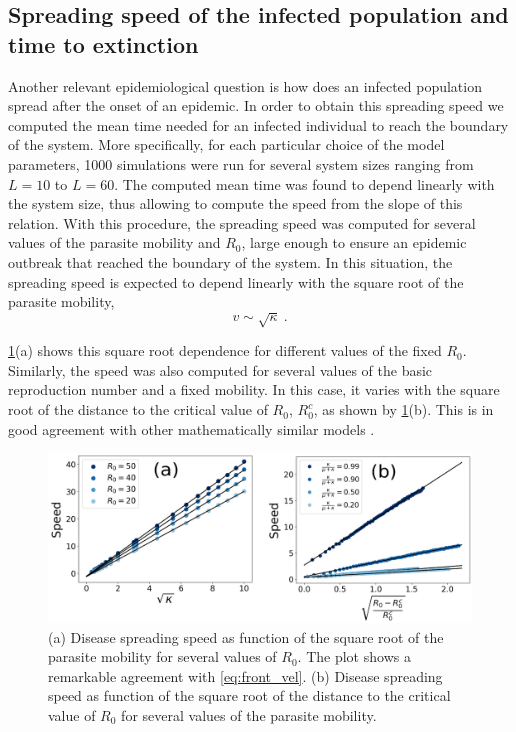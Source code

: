 \subsection{Spreading speed of the infected population and time to extinction}

Another relevant epidemiological question is how does an infected
population spread after the onset of an epidemic. In order to obtain this
spreading speed we computed the mean time needed for an infected individual to
reach the boundary of the system. More specifically, for each particular choice
of the model parameters, 1000 simulations were run for several system sizes
ranging from $L=10$ to $L=60$. The computed mean time was found to depend
linearly with the system size, thus allowing to compute the speed from the
slope of this relation. With this procedure, the spreading speed was computed
for several values of the parasite mobility and $R_0$, large enough to ensure
an epidemic outbreak that reached the boundary of the system. In this
situation, the spreading speed is expected to depend linearly with the square
root of the parasite mobility,
\begin{equation}\label{eq:front_vel}
    v\sim\sqrt{\kappa} \ .
\end{equation}

\cref{fig:front_velocity}(a) shows this square root dependence for
different values of the fixed $R_0$. Similarly, the speed was also computed for
several values of the basic reproduction number and a fixed mobility. In this
case, it varies with the square root of the distance to the critical value of
$R_0$, $R_0^c$, as shown by \cref{fig:front_velocity}(b). This is in good
agreement with other mathematically similar models \cite{Bertuzzo2010}.

\begin{figure}[H]
    \centering
    \includegraphics[width=1\textwidth]{Figures/Front_velocity.png}
    \caption{(a) Disease spreading speed as function of the square root of
        the parasite mobility for several values of $R_0$. The plot shows a
        remarkable
        agreement with \cref{eq:front_vel}. (b) Disease spreading speed as
        function of
        the square root of the distance to the critical value of $R_0$ for
        several
        values of the parasite mobility.}
    \label{fig:front_velocity}
\end{figure}

